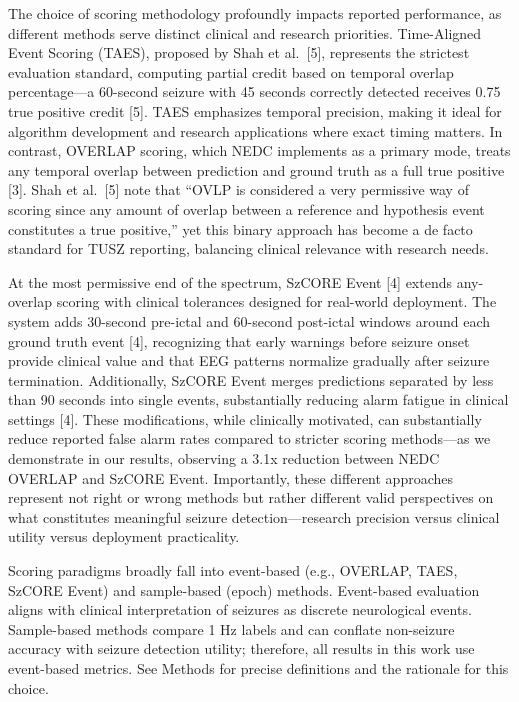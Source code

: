 \documentclass[
]{article}
\begin{document}
The choice of scoring methodology profoundly impacts reported
performance, as different methods serve distinct clinical and research
priorities. Time-Aligned Event Scoring (TAES), proposed by Shah et
al.~{[}5{]}, represents the strictest evaluation standard, computing
partial credit based on temporal overlap percentage---a 60-second
seizure with 45 seconds correctly detected receives 0.75 true positive
credit {[}5{]}. TAES emphasizes temporal precision, making it ideal for
algorithm development and research applications where exact timing
matters. In contrast, OVERLAP scoring, which NEDC implements as a
primary mode, treats any temporal overlap between prediction and ground
truth as a full true positive {[}3{]}. Shah et al.~{[}5{]} note that
``OVLP is considered a very permissive way of scoring since any amount
of overlap between a reference and hypothesis event constitutes a true
positive,'' yet this binary approach has become a de facto standard for
TUSZ reporting, balancing clinical relevance with research needs.

At the most permissive end of the spectrum, SzCORE Event {[}4{]} extends
any-overlap scoring with clinical tolerances designed for real-world
deployment. The system adds 30-second pre-ictal and 60-second post-ictal
windows around each ground truth event {[}4{]}, recognizing that early
warnings before seizure onset provide clinical value and that EEG
patterns normalize gradually after seizure termination. Additionally,
SzCORE Event merges predictions separated by less than 90 seconds into
single events, substantially reducing alarm fatigue in clinical settings
{[}4{]}. These modifications, while clinically motivated, can
substantially reduce reported false alarm rates compared to stricter
scoring methods---as we demonstrate in our results, observing a 3.1x
reduction between NEDC OVERLAP and SzCORE Event. Importantly, these
different approaches represent not right or wrong methods but rather
different valid perspectives on what constitutes meaningful seizure
detection---research precision versus clinical utility versus deployment
practicality.

Scoring paradigms broadly fall into event-based (e.g., OVERLAP, TAES,
SzCORE Event) and sample-based (epoch) methods. Event-based evaluation
aligns with clinical interpretation of seizures as discrete neurological
events. Sample-based methods compare 1 Hz labels and can conflate
non-seizure accuracy with seizure detection utility; therefore, all
results in this work use event-based metrics. See Methods for precise
definitions and the rationale for this choice.
\end{document}
